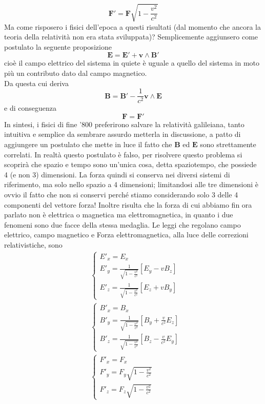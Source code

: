 \documentclass[
10pt, %
a4paper, %
oneside, %
headinclude,footinclude, %
BCOR5mm, %
]{scrartcl}
\begin{document}
\[\mathbf{F'}=\mathbf{F}\sqrt{1-\frac{v^2}{c^2}}\]
Ma come risposero i fisici dell'epoca a questi risultati (dal momento che ancora la teoria della relatività non era stata sviluppata)? Semplicemente aggiunsero come postulato la seguente proposizione
\[\mathbf{E}=\mathbf{E}'+\mathbf{v}\wedge\mathbf{B}'\]
cioè il campo elettrico del sistema in quiete è uguale a quello del sistema in moto più un contributo dato dal campo magnetico.\\
Da questa cui deriva
\[\mathbf{B}=\mathbf{B}'-\frac{1}{c^2}\mathbf{v}\wedge\mathbf{E}\]
e di conseguenza
\[\mathbf{F}=\mathbf{F}'\]
In sintesi, i fisici di fine '800 preferirono salvare la relatività galileiana, tanto intuitiva e semplice da sembrare assurdo metterla in discussione, a patto di aggiungere un postulato che mette in luce il fatto che \(\mathbf{B}\) ed \(\mathbf{E}\) sono strettamente correlati. In realtà questo postulato è falso, per risolvere questo problema si scoprirà che spazio e tempo sono un'unica cosa, detta spaziotempo, che possiede 4 (e non 3) dimensioni. La forza quindi si conserva nei diversi sistemi di riferimento, ma solo nello spazio a 4 dimensioni; limitandosi alle tre dimensioni è ovvio il fatto che non si conservi perché stiamo considerando solo 3 delle 4 componenti del vettore forza! Inoltre risulta che la forza di cui abbiamo fin ora parlato non è elettrica o magnetica ma elettromagnetica, in quanto i due fenomeni sono due facce della stessa medaglia. Le leggi che regolano campo elettrico, campo magnetico e Forza elettromagnetica, alla luce delle correzioni relativistiche, sono
\begin{align*}
	&\begin{cases}
		E'_x=E_x \\
		E'_y=\frac{1}{\sqrt{1-\frac{v^2}{c^2}}}[E_y-vB_z]\\
		E'_z=\frac{1}{\sqrt{1-\frac{v^2}{c^2}}}[E_z+vB_y]
	\end{cases}\\
	&\begin{cases}
		B'_x=B_x \\
		B'_y=\frac{1}{\sqrt{1-\frac{v^2}{c^2}}}[B_y+\frac{v}{c^2}E_z] \\
		B'_z=\frac{1}{\sqrt{1-\frac{v^2}{c^2}}}[B_z-\frac{v}{c^2}E_y]
	\end{cases}\\
	&\begin{cases}
		F'_x=F_x \\
		F'_y=F_y\sqrt{1-\frac{v^2}{c^2}} \\
		F'_z=F_z\sqrt{1-\frac{v^2}{c^2}}
	\end{cases}	
\end{align*}
\end{document}
